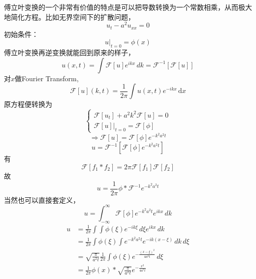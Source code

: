 \documentclass[12pt,a4paper,openany,twoside]{book}
\numberwithin{equation}{section}
\newcommand{\ud}{\mathrm{d}}
\begin{document}
        傅立叶变换的一个非常有价值的特点是可以把导数转换为一个常数相乘，从而极大地简化方程。比如无界空间下的扩散问题，
        \begin{equation*}
          u_t-a^2u_{xx} = 0
        \end{equation*} 
        初始条件：
        \begin{equation*}
          u\big|_{t=0} = \phi(x)
        \end{equation*} 
        傅立叶变换再逆变换就能回到原来的样子，
        \begin{equation*}
          u(x,t) = \int \mathcal{F}[u] e^{ikx} \, dk = \mathcal{F}^{-1}[\mathcal{F}[u]]
        \end{equation*} 
        对$x$做Fourier Transform,
        \begin{equation*}
          \mathcal{F}[u](k,t) = \frac{1}{2\pi} \int u(x,t) e^{-ikx} \, \ud x 
        \end{equation*} 
        原方程便转换为
        \begin{equation*}
          \begin{cases}
            \mathcal{F}[u_t] + a^2 k^2 \mathcal{F}[u] = 0 \\
            \mathcal{F}[u]\big|_{t=0} = \mathcal{F}[\phi]
          \end{cases}
        \end{equation*} 
        \begin{equation*}
          \Rightarrow \mathcal{F}[u] = \mathcal{F}[\phi] e^{-k^2 a^2 t}
        \end{equation*} 
        \begin{equation*}
          u = \mathcal{F}^{-1} [\mathcal{F}[\phi] e^{-k^2a^2 t}]
        \end{equation*} 
        有
        \begin{equation*}
          \mathcal{F}[f_1 * f_2] = 2\pi \mathcal{F}[f_1] \mathcal{F} [f_2]
        \end{equation*} 
        故
        \begin{equation*}
          u = \frac{1}{2\pi} \phi * \mathcal{F}^{-1} e^{-k^2 a^2 t} 
        \end{equation*} 
        当然也可以直接套定义，
        \begin{equation*}
          u = \int_{-\infty} ^\infty \mathcal{F}[\phi] e^{-k^2 a^2 t} e^{ikx} \, dk 
        \end{equation*} 
        \begin{align*}
          u &= \frac{1}{2\pi}\int \int \phi(\xi) e^{-ik\xi} \, d\xi e^{ikx}  \, dk\\
            &=\frac{1}{2\pi} \int \phi(\xi) \int e^{-k^2 a^2 t} e^{-ik(x-\xi)} \, dk  \, d\xi \\
            &=\sqrt{\frac{\pi}{a^2 t}}\frac{1}{2\pi} \int \phi(\xi) e^{-\frac{(x-\xi)^2}{4a^2 t}} \, d\xi\\
            &=\frac{1}{2\pi} \phi(x) * \sqrt{\frac{\pi}{a^2 t}} e^{-\frac{x^2}{4 a^2 t}}
        \end{align*}
\end{document}
